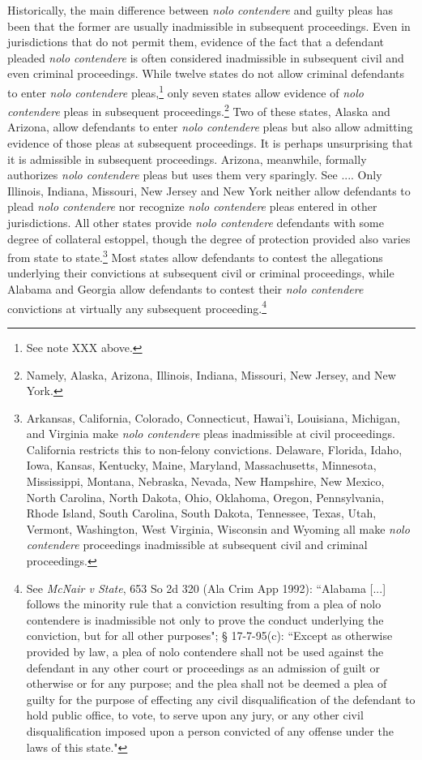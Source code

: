 Historically, the main difference between \textit{nolo contendere} and guilty pleas has been that the former are usually inadmissible in subsequent proceedings. Even in jurisdictions that do not permit them, evidence of the fact that a defendant pleaded \textit{nolo contendere} is often considered inadmissible in subsequent civil and even criminal proceedings. While twelve states do not allow criminal defendants to enter \textit{nolo contendere} pleas,\footnote{See note XXX above.} only seven states allow evidence of \textit{nolo contendere} pleas in subsequent proceedings.\footnote{Namely, Alaska, Arizona, Illinois, Indiana, Missouri, New Jersey, and New York.} Two of these states, Alaska and Arizona, allow defendants to enter \textit{nolo contendere} pleas but also allow admitting evidence of those pleas at subsequent proceedings. It is perhaps unsurprising that it is admissible in subsequent proceedings. Arizona, meanwhile, formally authorizes \textit{nolo contendere} pleas but uses them very sparingly. See ....  Only Illinois, Indiana, Missouri, New Jersey and New York neither allow defendants to plead \textit{nolo contendere} nor recognize \textit{nolo contendere} pleas entered in other jurisdictions. All other states provide \textit{nolo contendere} defendants with some degree of collateral estoppel, though the degree of protection provided also varies from state to state.\footnote{Arkansas, California, Colorado, Connecticut, Hawai'i, Louisiana, Michigan, and Virginia make \textit{nolo contendere} pleas inadmissible at civil proceedings. California restricts this to non-felony convictions. Delaware, Florida, Idaho, Iowa, Kansas, Kentucky, Maine, Maryland, Massachusetts, Minnesota, Mississippi, Montana, Nebraska, Nevada, New Hampshire, New Mexico, North Carolina, North Dakota, Ohio, Oklahoma, Oregon, Pennsylvania, Rhode Island, South Carolina, South Dakota, Tennessee, Texas, Utah, Vermont, Washington, West Virginia, Wisconsin and Wyoming all make \textit{nolo contendere} proceedings inadmissible at subsequent civil and criminal proceedings.} Most states allow defendants to contest the allegations underlying their convictions at subsequent civil or criminal proceedings, while Alabama and Georgia allow defendants to contest their \textit{nolo contendere} convictions at virtually any subsequent proceeding.\footnote{See \textit{McNair v State}, 653 So 2d 320 (Ala Crim App 1992): ``Alabama [...] follows the minority rule that a conviction resulting from a plea of nolo contendere is inadmissible not only to prove the conduct underlying the conviction, but for all other purposes"; § 17-7-95(c): ``Except as otherwise provided by law, a plea of nolo contendere shall not be used against the defendant in any other court or proceedings as an admission of guilt or otherwise or for any purpose; and the plea shall not be deemed a plea of guilty for the purpose of effecting any civil disqualification of the defendant to hold public office, to vote, to serve upon any jury, or any other civil disqualification imposed upon a person convicted of any offense under the laws of this state."}

